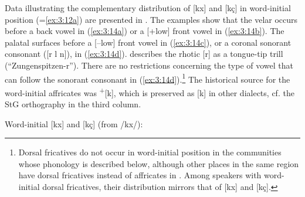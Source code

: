 Data illustrating the complementary distribution of [kx] and [kç] in word-initial position (=\ref{ex:3:12a}) are presented in . The examples show that the velar occurs before a back vowel in (\ref{ex:3:14a}) or a [+low] front vowel in (\ref{ex:3:14b}). The palatal surfaces before a [{}--low] front vowel in (\ref{ex:3:14c}), or a coronal sonorant consonant ([r l n]), in (\ref{ex:3:14d}). \citet[11]{Berger1913} describes the rhotic [r] as a tongue-tip trill (“Zungenspitzen-r”). There are no restrictions concerning the type of vowel that can follow the sonorant consonant in (\ref{ex:3:14d}).\footnote{\label{fn:3:11}Dorsal fricatives do not occur in word-initial position in the communities whose phonology is described below, although other places in the same region have dorsal fricatives instead of affricates in . Among speakers with word-initial dorsal fricatives, their distribution mirrors that of [kx] and [kç].} The historical source for the word-initial affricates was  \textsuperscript{+}[k], which is preserved as [k] in other dialects, cf. the StG orthography in the third column.\largerpage

\ea Word-initial [kx] and [kç] (from /kx/):\label{ex:3:14}
    
